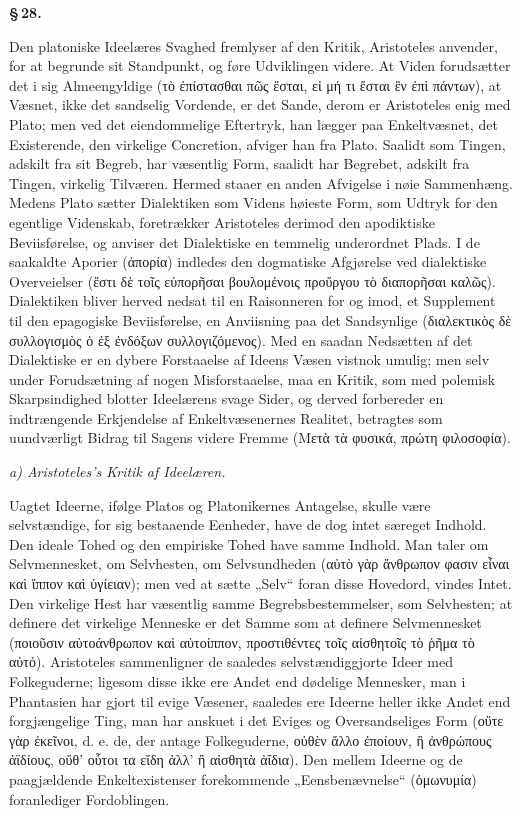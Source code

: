 \documentclass[12pt]{book}
\newcommand{\opage}[1]{\marginnote{\footnotesize\textit{[#1]}}}
\begin{document}
\begin{center}{\bfseries \S\,28.}\end{center}

Den platoniske Ideelæres Svaghed fremlyser af den Kritik, Aristoteles anvender, for at begrunde
sit Standpunkt, og føre Udviklingen videre. At Viden forudsætter det i sig Almeengyldige (τὸ
ἐπίστασθαι πῶς ἔσται, εἰ μή τι ἔσται ἓν ἐπὶ πάντων), at Væsnet, ikke det sandselig Vordende, er
det Sande, derom er Aristoteles enig med Plato; men ved det eiendommelige Eftertryk, han lægger
paa Enkeltvæsnet, det Existerende, den virkelige Concretion, afviger han fra Plato. Saalidt som
Tingen, adskilt fra sit Begreb, har væsentlig Form, saalidt har Begrebet, adskilt fra Tingen,
virkelig Tilværen. Hermed staaer en anden Afvigelse i nøie Sammenhæng. Medens Plato sætter
Dialektiken som Videns høieste Form, som Udtryk for den egentlige Videnskab, foretrækker
Aristoteles derimod den
\opage{137} apodiktiske Beviisførelse, og anviser det Dialektiske en temmelig underordnet Plads. I de
saakaldte Aporier (ἀπορία) indledes den dogmatiske Afgjørelse ved dialektiske Overveielser (ἔστι
δὲ τοῖς εὐπορῆσαι βουλομένοις προὔργου τὸ διαπορῆσαι καλῶς). Dialektiken bliver herved nedsat til
en Raisonneren for og imod, et Supplement til den epagogiske Beviisførelse, en Anviisning paa det
Sandsynlige (διαλεκτικὸς δὲ συλλογισμὸς ὁ ἐξ ἐνδόξων συλλογιζόμενος). Med en saadan Nedsætten af
det Dialektiske er en dybere Forstaaelse af Ideens Væsen vistnok umulig; men selv under
Forudsætning af nogen Misforstaaelse, maa en Kritik, som med polemisk Skarpsindighed blotter
Ideelærens svage Sider, og derved forbereder en indtrængende Erkjendelse af Enkeltvæsenernes
Realitet, betragtes som uundværligt Bidrag til Sagens videre Fremme (Μετὰ τὰ φυσικά, πρώτη
φιλοσοφία).

\emph{a) Aristoteles's Kritik af Ideelæren.}

Uagtet Ideerne, ifølge Platos og Platonikernes Antagelse, skulle være selvstændige, for sig
bestaaende Eenheder, have de dog intet særeget Indhold. Den ideale Tohed og den empiriske Tohed
have samme Indhold. Man taler om Selvmennesket, om Selvhesten, om Selvsundheden (αὐτὸ γὰρ
ἄνθρωπον φασιν εἶναι καὶ ἵππον καὶ ὑγίειαν); men ved at sætte „Selv“ foran disse Hovedord, vindes
Intet. Den virkelige Hest har væsentlig samme Begrebsbestemmelser, som Selvhesten; at definere
det virkelige Menneske er det Samme som at definere Selvmennesket (ποιοῦσιν αὐτοάνθρωπον καὶ
αὐτοίππον, προστιθέντες τοῖς αἰσθητοῖς τὸ ῥῆμα τὸ αὐτό). Aristoteles sammenligner de saaledes
selvstændiggjorte Ideer med Folkeguderne; ligesom disse ikke ere Andet end dødelige Mennesker,
man i Phantasien har gjort til evige Væsener, saaledes ere Ideerne heller ikke Andet end
forgjængelige Ting, man har anskuet i det Eviges og Oversandseliges Form (οὔτε γὰρ ἐκεῖνοι, d. e.
de, der antage Folkeguderne,
\opage{138} οὐθὲν ἄλλο ἐποίουν, ἢ ἀνθρώπους ἀϊδίους, οὔθ' οὗτοι τα εἴδη ἀλλ' ἢ αἰσθητὰ ἀΐδια). Den mellem
Ideerne og de paagjældende Enkeltexistenser forekommende „Eensbenævnelse“ (ὁμωνυμία) foranlediger
Fordoblingen.
\end{document}
